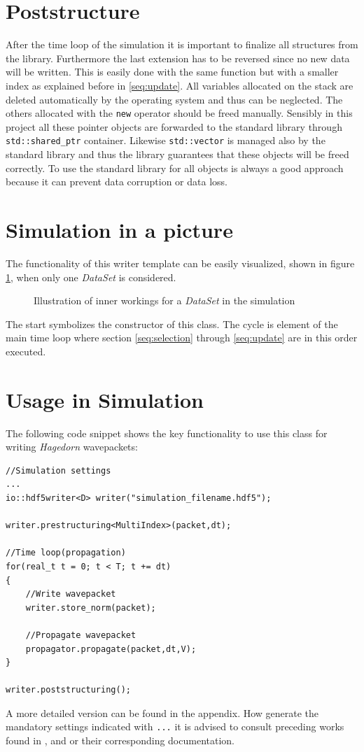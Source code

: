 \section{Poststructure}
After the time loop of the simulation it is important to finalize all structures from the library. Furthermore the last extension has to be reversed since no new data will be written. This is easily done with the same function but with a smaller index as explained before in \ref{seq:update}. All variables allocated on the stack are deleted automatically by the operating system and thus can be neglected. The others allocated with the \texttt{new} operator should be freed manually. Sensibly in this project all these pointer objects are forwarded to the standard library through \texttt{std::shared\_ptr} container. Likewise \texttt{std::vector} is managed also by the standard library and thus the library guarantees that these objects will be freed correctly. To use the standard library for all objects is always a good approach because it can prevent data corruption or data loss.

\section{Simulation in a picture}
The functionality of this writer template can be easily visualized, shown in figure \ref{fig:illustration}, when only one \textit{DataSet} is considered.
\begin{figure}[ht!]
\caption{Illustration of inner workings for a \textit{DataSet} in the simulation}
\label{fig:illustration}
\end{figure}
The start symbolizes the constructor of this class. The cycle is element of the main time loop where section \ref{seq:selection} through \ref{seq:update} are in this order executed.

\section{Usage in Simulation}
The following code snippet shows the key functionality to use this class for writing \textit{Hagedorn} wavepackets:

\begin{lstlisting}
//Simulation settings
...
io::hdf5writer<D> writer("simulation_filename.hdf5");

writer.prestructuring<MultiIndex>(packet,dt);

//Time loop(propagation)
for(real_t t = 0; t < T; t += dt)
{
	//Write wavepacket
	writer.store_norm(packet);
	
	//Propagate wavepacket
   	propagator.propagate(packet,dt,V);
}

writer.poststructuring();
\end{lstlisting}
A more detailed version can be found in the appendix. How generate the mandatory settings indicated with \texttt{...} it is advised to consult preceding works found in \cite{bt_michajab}, \cite{st_benedekv} and \cite{bt_lionelm} or their corresponding documentation.

